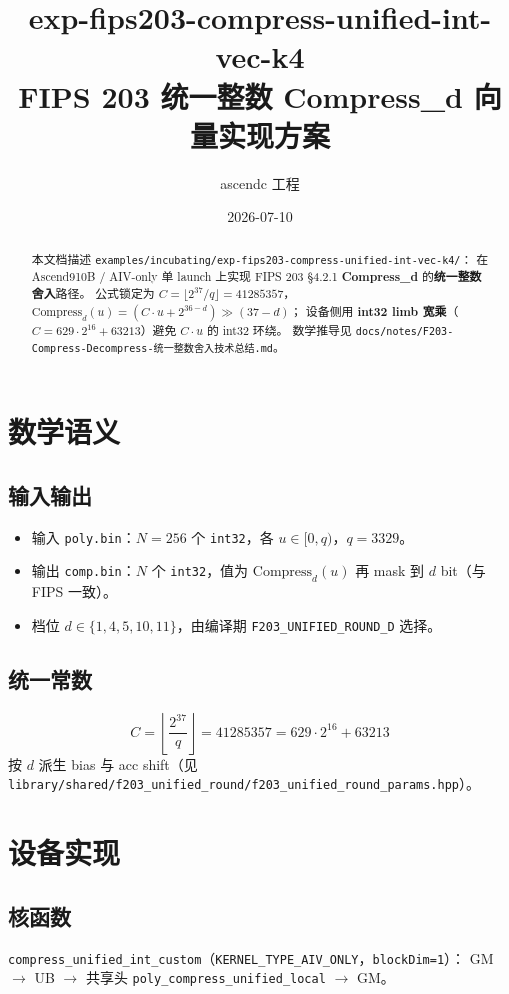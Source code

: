 \documentclass[UTF8,a4paper,11pt]{ctexart}
\title{exp-fips203-compress-unified-int-vec-k4\\FIPS 203 统一整数 Compress\_d 向量实现方案}
\author{ascendc 工程}
\date{2026-07-10}
\begin{document}
\maketitle

\begin{abstract}
本文档描述 \texttt{examples/incubating/exp-fips203-compress-unified-int-vec-k4/}：
在 Ascend910B / AIV-only 单 launch 上实现 FIPS 203 §4.2.1 \textbf{Compress\_d} 的\textbf{统一整数舍入}路径。
公式锁定为 $C=\lfloor 2^{37}/q\rfloor=41285357$，$\text{Compress}_d(u)=(C\cdot u+2^{36-d})\gg(37-d)$；
设备侧用 \textbf{int32 limb 宽乘}（$C=629\cdot 2^{16}+63213$）避免 $C\cdot u$ 的 int32 环绕。
数学推导见 \texttt{docs/notes/F203-Compress-Decompress-统一整数舍入技术总结.md}。
\end{abstract}

\section{数学语义}

\subsection{输入输出}
\begin{itemize}
  \item 输入 \texttt{poly.bin}：$N=256$ 个 \texttt{int32}，各 $u\in[0,q)$，$q=3329$。
  \item 输出 \texttt{comp.bin}：$N$ 个 \texttt{int32}，值为 $\text{Compress}_d(u)$ 再 mask 到 $d$ bit（与 FIPS 一致）。
  \item 档位 $d\in\{1,4,5,10,11\}$，由编译期 \texttt{F203\_UNIFIED\_ROUND\_D} 选择。
\end{itemize}

\subsection{统一常数}
\[
  C = \left\lfloor \frac{2^{37}}{q} \right\rfloor = 41285357 = 629\cdot 2^{16} + 63213
\]
按 $d$ 派生 bias 与 acc shift（见 \texttt{library/shared/f203\_unified\_round/f203\_unified\_round\_params.hpp}）。

\section{设备实现}

\subsection{核函数}
\texttt{compress\_unified\_int\_custom}（\texttt{KERNEL\_TYPE\_AIV\_ONLY}，\texttt{blockDim=1}）：
GM $\rightarrow$ UB $\rightarrow$ 共享头 \texttt{poly\_compress\_unified\_local} $\rightarrow$ GM。
\end{document}
